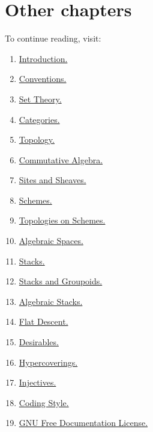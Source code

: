 \section{Other chapters}

\noindent
To continue reading, visit:
\begin{enumerate}
\item \hyperref[introduction-section-overview]{Introduction.}
\item \hyperref[conventions-section-comments]{Conventions.}
\item \hyperref[sets-section-introduction]{Set Theory.}
\item \hyperref[categories-section-introduction]{Categories.}
\item \hyperref[topology-section-introduction]{Topology.}
\item \hyperref[algebra-section-introduction]{Commutative Algebra.}
\item \hyperref[sites-section-introduction]{Sites and Sheaves.}
\item \hyperref[schemes-section-introduction]{Schemes.}
\item \hyperref[etale-section-introduction]{Topologies on Schemes.}
\item \hyperref[spaces-section-introduction]{Algebraic Spaces.}
\item \hyperref[stacks-section-introduction]{Stacks.}
\item \hyperref[stacks-groupoids-section-introduction]{Stacks and Groupoids.}
\item \hyperref[algebraic-section-introduction]{Algebraic Stacks.}
\item \hyperref[flat-section-introduction]{Flat Descent.}
\item \hyperref[desirables-section-introduction]{Desirables.}
\item \hyperref[hypercovering-section-introduction]{Hypercoverings.}
\item \hyperref[injectives-section-introduction]{Injectives.}
\item \hyperref[coding-section-style]{Coding Style.}
\item \hyperref[fdl-version]{GNU Free Documentation License.}
\end{enumerate}
